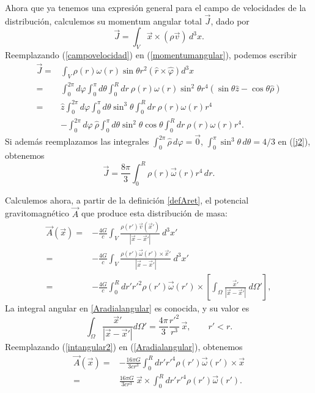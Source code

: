 Ahora que ya tenemos una expresión general para el campo de velocidades de la distribución, calculemos su momentum angular total $\vec{J}$, dado por
\begin{equation}
\vec{J}=\int_V \vec{x}\times(\rho \vec{v})\,d^3x.\label{momentumangular}
\end{equation}
Reemplazando (\ref{campovelocidad}) en (\ref{momentumangular}), podemos escribir
\begin{align}
\vec{J}={}&\int_V \rho (r)\omega(r)\sin \theta r^2(\hat{r}\times\hat{\varphi })d^3x\\
 ={}&\int_0^{2\pi}d\varphi \int_0^{\pi}d\theta \int_0^{R}dr\ \rho (r)\omega(r)\sin^2 \theta r^4\left(\sin \theta \hat{z}-\cos \theta \hat{\rho}\right)\\
 ={}&\hat{z}\int_0^{2\pi}d\varphi \int_0^{\pi}d\theta \sin^3 \theta  \int_0^{R}dr\ \rho (r)\omega(r)r^4\nonumber\\
 {}&-\int_0^{2\pi}d\varphi \ \hat{\rho}\int_0^{\pi}d\theta \sin^2 \theta \cos \theta  \int_0^{R}dr\ \rho (r)\omega(r)r^4.\label{j2}
\end{align}
Si además reemplazamos las integrales $\int_0^{2\pi}\hat{\rho}\,d\varphi =\vec{0}$, $\int_0^{\pi}\sin^3\theta\,d\theta  ={4}/{3}$ en (\ref{j2}), obtenemos
\begin{equation}\boxed{
\vec{J}=\frac{8\pi}{3}\int_0^{R}\rho (r)\vec{\omega}(r)r^4\, dr.}\label{jgeneral}
\end{equation}

Calculemos ahora, a partir de la definición \eqref{defAret}, el potencial gravitomagnético $\vec{A}$ que produce esta distribución de masa:
\begin{align}
\vec{A}(\vec{x})={}&-\frac{4G}{c}\int_V \frac{\rho (r') \vec{v}(\vec{x}')}{|\vec{x}-\vec{x}'|}\ d^3x'\\
 ={}&-\frac{4G}{c}\int_V \frac{\rho (r') \vec{\omega}(r')\times\vec{x}'}{|\vec{x}-\vec{x}'|}\ d^3x'\\
 ={}&-\frac{4G}{c}\int_0^{R}dr'r'^2\rho (r')\vec{\omega}(r')\times\left[\int_{\Omega}\frac{\vec{x}'}{|\vec{x}-\vec{x}'|}\ d\Omega'\right],\label{Aradialangular}
\end{align}
La integral angular en \eqref{Aradialangular} es conocida, y su valor es
\begin{equation}
\int_{\Omega}\frac{\vec{x}'}{|\vec{x}-\vec{x}'|}d\Omega'=
\dfrac{4\pi}{3}\frac{r'^2}{r^3}\, \vec{x}, \qquad r'<r .\label{intangular2}
\end{equation}
Reemplazando (\ref{intangular2}) en (\ref{Aradialangular}), obtenemos
\begin{align}
\vec{A}(\vec{x})={}&-\frac{16\pi G}{3cr^3}\int_0^{R}dr'r'^4\rho (r')\vec{\omega}(r')\times\vec{x}\\
={}&\frac{16\pi G}{3cr^3}\ \vec{x}\times\int_0^{R}dr'r'^4\rho (r')\vec{\omega}(r').\label{Acasi}
\end{align}

